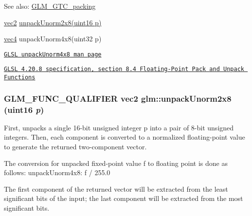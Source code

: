 \begin{Desc}
\item[See also:]\hyperlink{group__gtc__packing}{GLM\_\-GTC\_\-packing} 

\hyperlink{group__core__types_ga1618f51db67eaa145db101d8c8431d8}{vec2} \hyperlink{group__gtc__packing_g96ce0c24339ee676e28a027fffd1edf6}{unpackUnorm2x8(uint16 p)} 

\hyperlink{group__core__types_g5881b1b022d7fd1b7218f5916532dd02}{vec4} unpackUnorm4x8(uint32 p) 

\href{http://www.opengl.org/sdk/docs/manglsl/xhtml/unpackUnorm4x8.xml}{\tt GLSL unpackUnorm4x8 man page} 

\href{http://www.opengl.org/registry/doc/GLSLangSpec.4.20.8.pdf}{\tt GLSL 4.20.8 specification, section 8.4 Floating-Point Pack and Unpack Functions} \end{Desc}
\hypertarget{group__gtc__packing_g96ce0c24339ee676e28a027fffd1edf6}{
\subsubsection[unpackUnorm2x8]{\setlength{\rightskip}{0pt plus 5cm}GLM\_\-FUNC\_\-QUALIFIER vec2 glm::unpackUnorm2x8 (uint16 {\em p})}}
\label{group__gtc__packing_g96ce0c24339ee676e28a027fffd1edf6}


First, unpacks a single 16-bit unsigned integer p into a pair of 8-bit unsigned integers. Then, each component is converted to a normalized floating-point value to generate the returned two-component vector.

The conversion for unpacked fixed-point value f to floating point is done as follows: unpackUnorm4x8: f / 255.0

The first component of the returned vector will be extracted from the least significant bits of the input; the last component will be extracted from the most significant bits.

